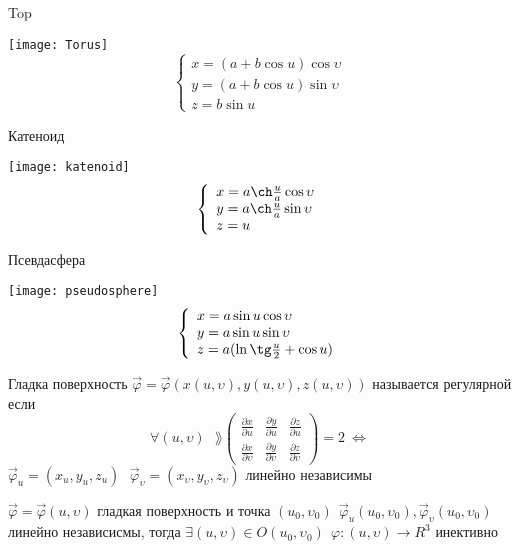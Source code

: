 \begin{block}[Примеры]
  \begin{center}
    Top
  \end{center}
  \texttt{[image: Torus]}
  $$
  \left\{
  \begin{array}{l}
    x = (a + b\cos u) \cos \upsilon \\
    y = (a + b\cos u) \sin \upsilon \\
    z = b \sin u
  \end{array}
  \right.
  $$
  \begin{center}
    Катеноид
  \end{center}
  \texttt{[image: katenoid]}
  $$
  \left\{
  \begin{array}{l}
    x = a \ch \frac{u}{a} \cos \upsilon \\
    y = a \ch \frac{u}{a} \sin \upsilon \\
    z = u
  \end{array}
  \right.
  $$
  \begin{center}
    Псевдасфера
  \end{center}
  \texttt{[image: pseudosphere]}
  $$
  \left\{
  \begin{array}{l}
    x = a \sin u \cos \upsilon \\
    y = a \sin u \sin \upsilon \\
    z = a( \ln \tg \frac{u}{2} + \cos u)
  \end{array}
  \right.
  $$
\end{block}

\begin{define}
  Гладка поверхность $\vec \varphi = \vec \varphi
  (x(u, \upsilon), y(u, \upsilon), z(u, \upsilon))$ называется регулярной если
  $$
  \forall (u, \upsilon) ~~~
  \rang \left(
  \begin{array}{ccc}
    \frac{\partial x}{\partial u} & \frac{\partial y}{\partial u} &
    \frac{\partial z}{\partial u} \\
    \frac{\partial x}{\partial \upsilon} &
    \frac{\partial y}{\partial \upsilon} &
    \frac{\partial z}{\partial \upsilon}
  \end{array}
  \right) = 2 ~ \Leftrightarrow
  $$
  $\vec \varphi_u = (x_u, y_u, z_u) ~~~ \vec \varphi_{\upsilon} =
  (x_{\upsilon}, y_{\upsilon}, z_{\upsilon})$ линейно независимы
\end{define}

\begin{theorem}
  $\vec \varphi = \vec \varphi(u, \upsilon)$ гладкая поверхность и точка
  $(u_0, \upsilon_0) ~~ \vec \varphi_u (u_0, \upsilon_0),
  \vec \varphi_{\upsilon} (u_0, \upsilon_0)$ линейно независисмы, тогда
  $\exists (u, \upsilon) \in O(u_0, \upsilon_0) ~~ \varphi : (u, \upsilon)
  \to R^3$ инективно
\end{theorem}

